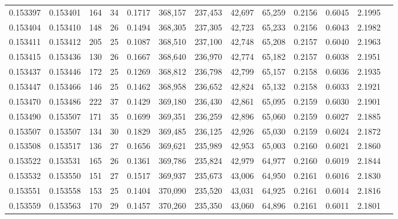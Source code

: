 \begin{tabular}{rrrrrrrrrrrrr}
0.153397 & 0.153401 &   164 &  34 &                                     0.1717 & 368,157 & 237,453 &  42,697 &  65,259 & 0.2156 & 0.6045 & 2.1995 \\
0.153404 & 0.153410 &   148 &  26 &                                     0.1494 & 368,305 & 237,305 &  42,723 &  65,233 & 0.2156 & 0.6043 & 2.1982 \\
0.153411 & 0.153412 &   205 &  25 &                                     0.1087 & 368,510 & 237,100 &  42,748 &  65,208 & 0.2157 & 0.6040 & 2.1963 \\
0.153415 & 0.153436 &   130 &  26 &                                     0.1667 & 368,640 & 236,970 &  42,774 &  65,182 & 0.2157 & 0.6038 & 2.1951 \\
0.153437 & 0.153446 &   172 &  25 &                                     0.1269 & 368,812 & 236,798 &  42,799 &  65,157 & 0.2158 & 0.6036 & 2.1935 \\
0.153447 & 0.153466 &   146 &  25 &                                     0.1462 & 368,958 & 236,652 &  42,824 &  65,132 & 0.2158 & 0.6033 & 2.1921 \\
0.153470 & 0.153486 &   222 &  37 &                                     0.1429 & 369,180 & 236,430 &  42,861 &  65,095 & 0.2159 & 0.6030 & 2.1901 \\
0.153490 & 0.153507 &   171 &  35 &                                     0.1699 & 369,351 & 236,259 &  42,896 &  65,060 & 0.2159 & 0.6027 & 2.1885 \\
0.153507 & 0.153507 &   134 &  30 &                                     0.1829 & 369,485 & 236,125 &  42,926 &  65,030 & 0.2159 & 0.6024 & 2.1872 \\
0.153508 & 0.153517 &   136 &  27 &                                     0.1656 & 369,621 & 235,989 &  42,953 &  65,003 & 0.2160 & 0.6021 & 2.1860 \\
0.153522 & 0.153531 &   165 &  26 &                                     0.1361 & 369,786 & 235,824 &  42,979 &  64,977 & 0.2160 & 0.6019 & 2.1844 \\
0.153532 & 0.153550 &   151 &  27 &                                     0.1517 & 369,937 & 235,673 &  43,006 &  64,950 & 0.2161 & 0.6016 & 2.1830 \\
0.153551 & 0.153558 &   153 &  25 &                                     0.1404 & 370,090 & 235,520 &  43,031 &  64,925 & 0.2161 & 0.6014 & 2.1816 \\
0.153559 & 0.153563 &   170 &  29 &                                     0.1457 & 370,260 & 235,350 &  43,060 &  64,896 & 0.2161 & 0.6011 & 2.1801 \\

\end{tabular}
